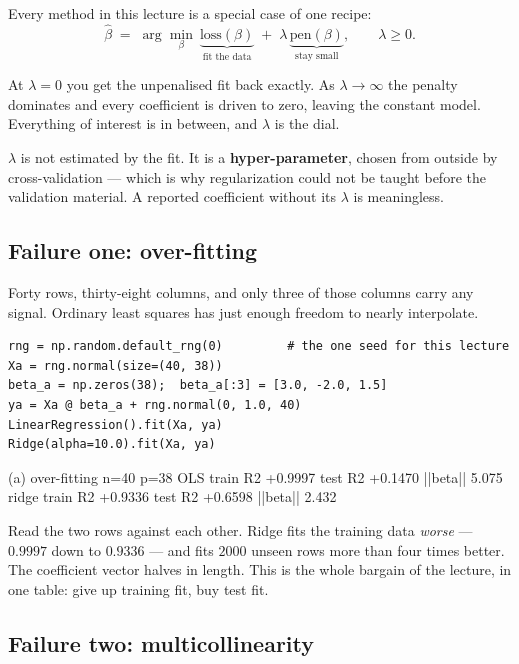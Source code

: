 \documentclass[11pt]{article}
\newcommand{\bhat}{\hat\beta}
\begin{document}
Every method in this lecture is a special case of one recipe:
\begin{equation}
  \bhat \;=\; \arg\min_\beta\ \underbrace{\text{loss}(\beta)}_{\text{fit the
  data}} \;+\; \lambda\,\underbrace{\text{pen}(\beta)}_{\text{stay small}},
  \qquad \lambda \ge 0 .
  \label{eq:general}
\end{equation}

At $\lambda = 0$ you get the unpenalised fit back exactly. As
$\lambda \to \infty$ the penalty dominates and every coefficient is driven to
zero, leaving the constant model. Everything of interest is in between, and
$\lambda$ is the dial.

\begin{keyidea}
$\lambda$ is not estimated by the fit. It is a \textbf{hyper-parameter},
chosen from outside by cross-validation --- which is why regularization could
not be taught before the validation material. A reported coefficient without
its $\lambda$ is meaningless.
\end{keyidea}

\subsection{Failure one: over-fitting}

Forty rows, thirty-eight columns, and only three of those columns carry any
signal. Ordinary least squares has just enough freedom to nearly interpolate.

\begin{lstlisting}
rng = np.random.default_rng(0)         # the one seed for this lecture
Xa = rng.normal(size=(40, 38))
beta_a = np.zeros(38);  beta_a[:3] = [3.0, -2.0, 1.5]
ya = Xa @ beta_a + rng.normal(0, 1.0, 40)
LinearRegression().fit(Xa, ya)
Ridge(alpha=10.0).fit(Xa, ya)
\end{lstlisting}
\begin{codeout}
(a) over-fitting     n=40  p=38
    OLS   train R2 +0.9997   test R2 +0.1470   ||beta||    5.075
    ridge train R2 +0.9336   test R2 +0.6598   ||beta||    2.432
\end{codeout}

Read the two rows against each other. Ridge fits the training data
\emph{worse} --- $0.9997$ down to $0.9336$ --- and fits $2000$ unseen rows more
than four times better. The coefficient vector halves in length. This is the
whole bargain of the lecture, in one table: give up training fit, buy test
fit.

\subsection{Failure two: multicollinearity}
\end{document}
